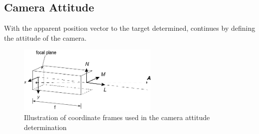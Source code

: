 \subsection{Camera Attitude}
With the apparent position vector to the target determined, \cite{OpNav} continues by defining the attitude of the camera.\\

\begin{figure}[htbp]
    \centering
    \includegraphics[width=0.6\textwidth]{images/cameracoordinates.png}
    \caption{Illustration of coordinate frames used in the camera attitude determination}
    \label{fig:cameracoordinates}
\end{figure}

